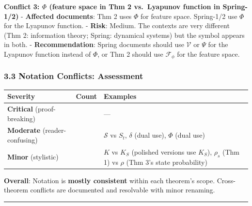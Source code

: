 \documentclass[
  12pt,
]{ctexart}
\begin{document}
\textbf{Conflict 3: \(\Phi\) (feature space in Thm 2 vs.~Lyapunov
function in Spring-1/2)} - \textbf{Affected documents}: Thm 2 uses
\(\Phi\) for feature space. Spring-1/2 use \(\Phi\) for the Lyapunov
function. - \textbf{Risk}: Medium. The contexts are very different (Thm
2: information theory; Spring: dynamical systems) but the symbol appears
in both. - \textbf{Recommendation}: Spring documents should use
\(\mathcal{V}\) or \(\Psi\) for the Lyapunov function instead of
\(\Phi\), or Thm 2 should use \(\mathcal{F}_{\phi}\) for the feature
space.

\subsubsection{3.3 Notation Conflicts:
Assessment}\label{notation-conflicts-assessment}

\begin{longtable}[]{@{}
  >{\raggedright\arraybackslash}p{}
  >{\raggedright\arraybackslash}p{}
  >{\raggedright\arraybackslash}p{}@{}}
\toprule\noalign{}
\begin{minipage}[b]{\linewidth}\raggedright
Severity
\end{minipage} & \begin{minipage}[b]{\linewidth}\raggedright
Count
\end{minipage} & \begin{minipage}[b]{\linewidth}\raggedright
Examples
\end{minipage} \\
\midrule\noalign{}
\endhead
\bottomrule\noalign{}
\endlastfoot
\textbf{Critical} (proof-breaking) & 0 & --- \\
\textbf{Moderate} (reader-confusing) & 3 & \(\mathcal{S}\) vs \(S_t\),
\(\delta\) (dual use), \(\Phi\) (dual use) \\
\textbf{Minor} (stylistic) & 2 & \(K\) vs \(K_S\) (polished versions use
\(K_S\)), \(\rho_s\) (Thm 1) vs \(\rho\) (Thm 3's state probability) \\
\end{longtable}

\textbf{Overall}: Notation is \textbf{mostly consistent} within each
theorem's scope. Cross-theorem conflicts are documented and resolvable
with minor renaming.

\begin{center}\rule{0.5\linewidth}{0.5pt}\end{center}
\end{document}
